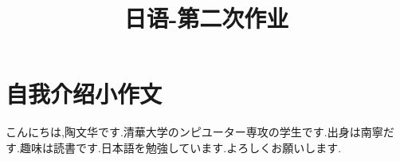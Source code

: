 
\usepackage{../../homeworks_preamble.sty}

\title{日语-第二次作业}


    \section{自我介绍小作文}
        こんにちは,陶文华です.清華大学のンピユーター専攻の学生です.出身は南寧だす.趣味は読書です.日本語を勉強しています.よろしくお願いします.

